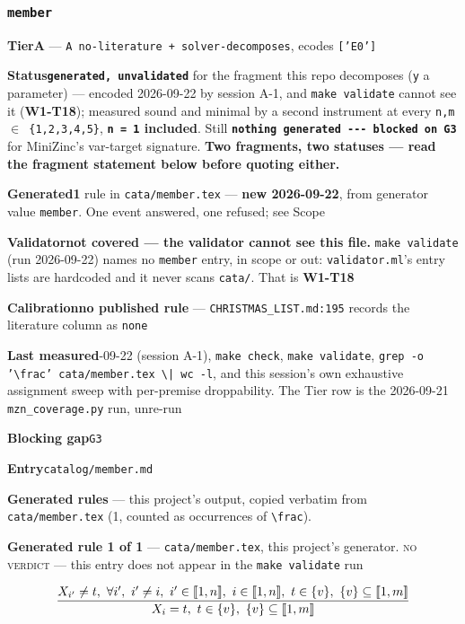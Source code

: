 \documentclass[10pt,a4paper]{article}
\newcommand{\entryfield}[2]{{\raggedright\textbf{#1}\quad #2\par}}
\newcommand{\rulebox}[1]{%
  \[\resizebox{\ifdim\width>\linewidth\linewidth\else\width\fi}{!}%
    {$\displaystyle #1$}\]}
\begin{document}
\subsubsection*{\texttt{member}}
\label{entry:member}
\entryfield{Tier}{\textbf{A} --- \texttt{A no-\allowbreak{}literature + solver-\allowbreak{}decomposes}, ecodes \texttt{['E0']}}
\entryfield{Status}{\textbf{\texttt{generated, unvalidated}} for the fragment this repo decomposes (\texttt{y} a parameter) --- encoded 2026-09-22 by session A-1, and \texttt{make validate} cannot see it (\textbf{W1-T18}); measured sound and minimal by a second instrument at every \texttt{n,m $\in$ \{1,2,3,4,5\}}, \textbf{\texttt{n = 1} included}. Still \textbf{\texttt{nothing generated -\allowbreak{}-\allowbreak{}-\allowbreak{} blocked on G3}} for MiniZinc's var-target signature. \textbf{Two fragments, two statuses --- read the fragment statement below before quoting either.}}
\entryfield{Generated}{\textbf{1} rule in \texttt{cata/member.tex} --- \textbf{new 2026-09-22}, from generator value \texttt{member}. One event answered, one refused; see Scope}
\entryfield{Validator}{\textbf{not covered --- the validator cannot see this file.} \texttt{make validate} (run 2026-09-22) names no \texttt{member} entry, in scope or out: \texttt{validator.ml}'s entry lists are hardcoded and it never scans \texttt{cata/}. That is \textbf{W1-T18}}
\entryfield{Calibration}{\textbf{no published rule} --- \texttt{CHRISTMAS\_LIST.md:195} records the literature column as \texttt{none}}
\entryfield{Last measured}{2026-09-22 (session A-1), \texttt{make check}, \texttt{make validate}, \texttt{grep -\allowbreak{}o '\textbackslash{}frac' cata/\allowbreak{}member.\allowbreak{}tex \textbackslash{}| wc -\allowbreak{}l}, and this session's own exhaustive assignment sweep with per-premise droppability. The Tier row is the 2026-09-21 \texttt{mzn\_coverage.py} run, unre-run}
\entryfield{Blocking gap}{\texttt{G3}}
\entryfield{Entry}{\texttt{catalog/member.md}}

\textbf{Generated rules} --- this project's output, copied verbatim from \texttt{cata/member.tex} (1, counted as occurrences of \texttt{\textbackslash{}frac}).\par

{\small\textbf{Generated rule 1 of 1} --- \texttt{cata/member.tex}, this project's generator. \textsc{no verdict} --- this entry does not appear in the \texttt{make validate} run\par}
\rulebox{\frac{X_{i'} \neq t,~\forall i',~i' \neq i,~i' \in \llbracket1,n\rrbracket,~i \in \llbracket1,n\rrbracket,~t \in \{v\},~\{v\} \subseteq \llbracket1,m\rrbracket}{X_{i}=t,~t \in \{v\},~\{v\} \subseteq \llbracket1,m\rrbracket}}
\end{document}
